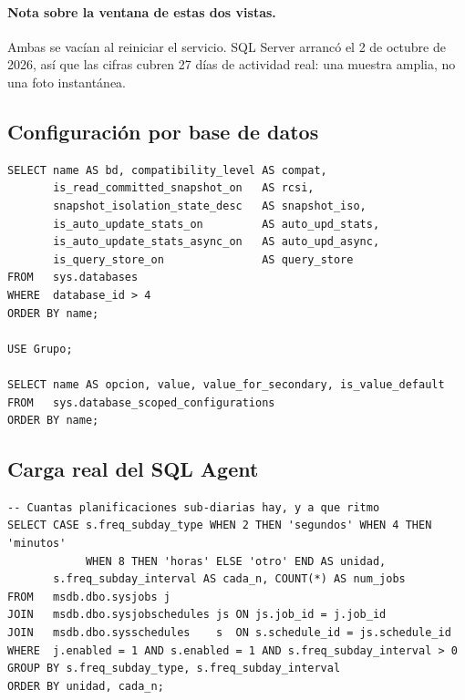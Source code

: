 \documentclass[11pt,a4paper]{article}
\begin{document}
\paragraph{Nota sobre la ventana de estas dos vistas.} Ambas se vacían al
reiniciar el servicio. SQL Server arrancó el 2 de octubre de 2026, así que las
cifras cubren 27 días de actividad real: una muestra amplia, no una foto
instantánea.

\subsection{Configuración por base de datos}

\begin{lstlisting}[style=sql]
SELECT name AS bd, compatibility_level AS compat,
       is_read_committed_snapshot_on   AS rcsi,
       snapshot_isolation_state_desc   AS snapshot_iso,
       is_auto_update_stats_on         AS auto_upd_stats,
       is_auto_update_stats_async_on   AS auto_upd_async,
       is_query_store_on               AS query_store
FROM   sys.databases
WHERE  database_id > 4
ORDER BY name;

USE Grupo;

SELECT name AS opcion, value, value_for_secondary, is_value_default
FROM   sys.database_scoped_configurations
ORDER BY name;
\end{lstlisting}

\subsection{Carga real del SQL Agent}

\begin{lstlisting}[style=sql]
-- Cuantas planificaciones sub-diarias hay, y a que ritmo
SELECT CASE s.freq_subday_type WHEN 2 THEN 'segundos' WHEN 4 THEN 'minutos'
            WHEN 8 THEN 'horas' ELSE 'otro' END AS unidad,
       s.freq_subday_interval AS cada_n, COUNT(*) AS num_jobs
FROM   msdb.dbo.sysjobs j
JOIN   msdb.dbo.sysjobschedules js ON js.job_id = j.job_id
JOIN   msdb.dbo.sysschedules    s  ON s.schedule_id = js.schedule_id
WHERE  j.enabled = 1 AND s.enabled = 1 AND s.freq_subday_interval > 0
GROUP BY s.freq_subday_type, s.freq_subday_interval
ORDER BY unidad, cada_n;
\end{lstlisting}
\end{document}
